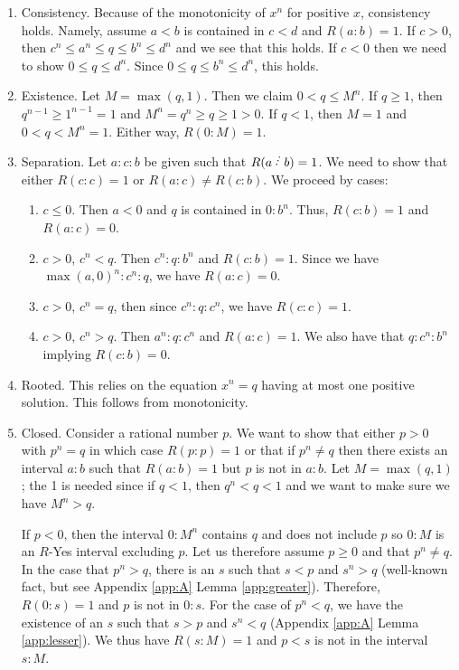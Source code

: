 \documentclass[12pt]{article}
\begin{document}
\begin{enumerate}
    \item Consistency. Because of the monotonicity of $x^n$ for positive $x$, consistency holds. Namely, assume $a\lt b$ is contained in $c \lt d$ and $R(a:b)=1$. If $c>0$, then $c^n \leq a^n \leq q \leq b^n \leq d^n$ and we see that this holds. If $c<0$ then we need to show $0 \leq q \leq d^n$. Since $0 \leq q \leq  b^n \leq d^n$, this holds. 
    \item Existence. Let $M = \max(q, 1)$. Then we claim $0 < q \leq M^n$. If $q \geq 1$, then $q^{n-1} \geq 1^{n-1} = 1$ and $M^n = q^n \geq q \geq 1 > 0$. If $ q < 1$, then $M=1$ and $0 < q < M^n = 1$. Either way, $R(0:M) = 1$. 
    \item Separation. Let $a: c: b$ be given such that $R(a \lte b)=1$. We need to show that either $R(c:c) = 1$ or $R(a:c) \neq R(c:b)$. We proceed by cases:
    \begin{enumerate}
        \item $c \leq 0$. Then $a<0$ and $q$ is contained in $0:b^n$. Thus, $R(c:b) = 1$ and $R(a:c) = 0$. 
        \item $c>0$, $c^n <q$. Then $c^n:q:b^n$ and $R(c:b)=1$. Since we have $\max(a, 0)^n :c^n:q$, we have $R(a:c)=0$. 
        \item $c>0$, $c^n = q$, then since $c^n : q : c^n$, we have $R(c:c) =1$.
        \item $c>0$, $c^n > q$. Then $a^n:q:c^n$ and $R(a:c) = 1$. We also have that $q:c^n:b^n$ implying $R(c:b)=0$.
    \end{enumerate}
     \item Rooted. This relies on the equation $x^n = q$ having at most one positive solution. This follows from monotonicity. 
    \item Closed. Consider a rational number $p$. We want to show that either $p>0$ with $p^n = q$ in which case $R(p:p)=1$ or that if $p^n \neq q$ then there exists an interval $a:b$ such that $R(a:b)=1$ but $p$ is not in $a:b$. Let $M = \max(q, 1)$; the 1 is needed since if $q<1$, then $q^n < q < 1$ and we want to make sure we have $M^n > q$.
    
    If $p < 0$, then the interval $0:M^n$ contains $q$ and does not include $p$ so $0:M$ is an $R$-Yes interval excluding $p$. Let us therefore assume $p \geq 0$ and that $p^n \neq q$. In the case that $p^n > q$, there is an $s$ such that $s<p$ and $s^n > q$ (well-known fact, but see Appendix \ref{app:A} Lemma \ref{app:greater}). Therefore, $R(0:s) = 1$ and $p$ is not in $0:s$. For the case of $p^n < q$, we have the existence of an $s$ such that $s > p$ and $s^n < q$ (Appendix \ref{app:A} Lemma \ref{app:lesser}). We thus have $R(s:M)=1$ and $p < s$ is not in the interval $s:M$.
    
\end{enumerate}
\end{document}
